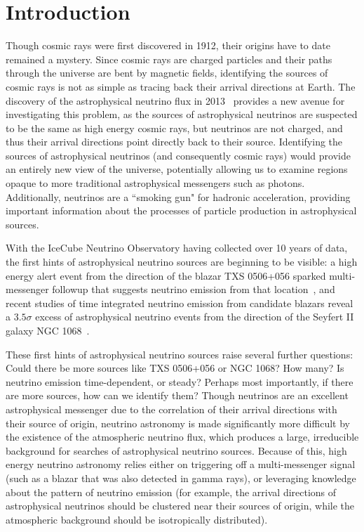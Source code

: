 \chapter{Introduction}\label{chapter:introduction}

Though cosmic rays were first discovered in 1912, their origins have to date remained a mystery. Since cosmic rays are charged particles and their paths through the universe are bent by magnetic fields, identifying the sources of cosmic rays is not as simple as tracing back their arrival directions at Earth. The discovery of the astrophysical neutrino flux in 2013~\cite{astroneutrinos} provides a new avenue for investigating this problem, as the sources of astrophysical neutrinos are suspected to be the same as high energy cosmic rays, but neutrinos are not charged, and thus their arrival directions point directly back to their source. Identifying the sources of astrophysical neutrinos (and consequently cosmic rays) would provide an entirely new view of the universe, potentially allowing us to examine regions opaque to more traditional astrophysical messengers such as photons. Additionally, neutrinos are a ``smoking gun" for hadronic acceleration, providing important information about the processes of particle production in astrophysical sources.

With the IceCube Neutrino Observatory having collected over 10 years of data, the first hints of astrophysical neutrino sources are beginning to be visible: a high energy alert event from the direction of the blazar TXS 0506+056 sparked multi-messenger followup that suggests neutrino emission from that location~\cite{TXS_Multimessenger}\cite{TXS_Archival}, and recent studies of time integrated neutrino emission from candidate blazars reveal a $3.5 \sigma$ excess of astrophysical neutrino events from the direction of the Seyfert II galaxy NGC 1068~\cite{10yr_tint}. 

These first hints of astrophysical neutrino sources raise several further questions: Could there be more sources like TXS 0506+056 or NGC 1068? How many? Is neutrino emission time-dependent, or steady? Perhaps most importantly, if there are more sources, how can we identify them? Though neutrinos are an excellent astrophysical messenger due to the correlation of their arrival directions with their source of origin, neutrino astronomy is made significantly more difficult by the existence of the atmospheric neutrino flux, which produces a large, irreducible background for searches of astrophysical neutrino sources. Because of this, high energy neutrino astronomy relies either on triggering off a multi-messenger signal (such as a blazar that was also detected in gamma rays), or leveraging knowledge about the pattern of neutrino emission (for example, the arrival directions of astrophysical neutrinos should be clustered near their sources of origin, while the atmospheric background should be isotropically distributed). 

